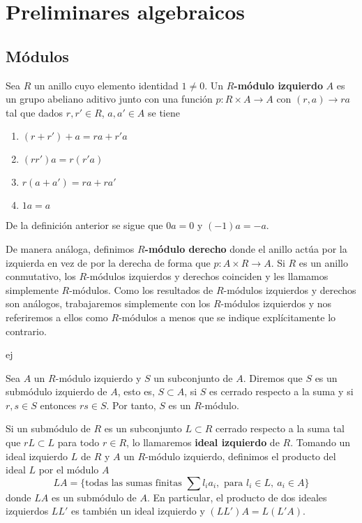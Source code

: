 
\chapter{Preliminares algebraicos}

\section{Módulos}

\begin{definicion}
	Sea $R$ un anillo cuyo elemento identidad $1 \neq 0$. Un \textbf{$R$-módulo izquierdo} $A$ es un grupo abeliano aditivo junto con una función $p: R \times A \rightarrow A$ con $(r, a) \to ra$ tal que dados $r,r' \in R$, $a,a' \in A$ se tiene
	\begin{enumerate}
		\item $(r+r')+a = ra + r'a$
		\item $(rr')a = r(r'a)$
		\item $r(a+a') = ra + ra'$
		\item $1a = a$
	\end{enumerate}
\end{definicion}

De la definición anterior se sigue que $0a = 0$ y $(-1)a = -a$.

De manera análoga, definimos \textbf{$R$-módulo derecho} donde el anillo actúa por la izquierda en vez de por la derecha de forma que $p: A \times R \rightarrow A$. Si $R$ es un anillo conmutativo, los $R$-módulos izquierdos y derechos coinciden y les llamamos simplemente $R$-módulos. Como los resultados de $R$-módulos izquierdos y derechos son análogos, trabajaremos simplemente con los $R$-módulos izquierdos y nos referiremos a ellos como $R$-módulos a menos que se indique explícitamente lo contrario.

\begin{ejemplo}
	ej
\end{ejemplo}

\begin{definicion}
	Sea $A$ un $R$-módulo izquierdo y $S$ un subconjunto de $A$. Diremos que $S$ es un submódulo izquierdo de $A$, esto es, $S \subset A$, si $S$ es cerrado respecto a la suma y si $r,s \in S$ entonces $rs \in S$. Por tanto, $S$ es un $R$-módulo.
\end{definicion}

Si un submódulo de $R$ es un subconjunto $L \subset R$ cerrado respecto a la suma tal que $rL \subset L$ para todo $r \in R$, lo llamaremos \textbf{ideal izquierdo} de $R$. Tomando un ideal izquierdo $L$ de $R$ y $A$ un $R$-módulo izquierdo, definimos el producto del ideal $L$ por el módulo $A$
\[ LA = \{\text{todas las sumas finitas } \sum l_ia_i, \text{ para } l_i \in L,\ a_i \in A \} \]
donde $LA$ es un submódulo de $A$. En particular, el producto de dos ideales izquierdos $LL'$ es también un ideal izquierdo y $(LL')A = L(L'A)$.

